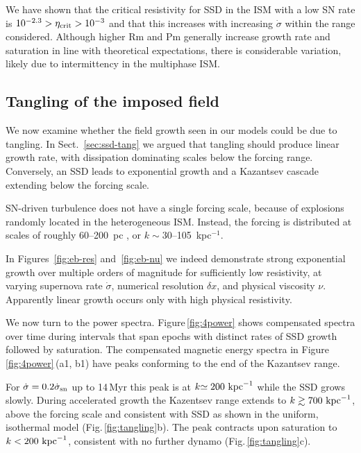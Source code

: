 \documentclass[preprint2]{aastex63}
\newcommand\SNr{\dot\sigma_{\rm sn}}
\newcommand\kpc{~ {\rm kpc}}
\newcommand\dx{ {\delta x}}
\begin{document}
{ {We have shown that the critical resistivity for SSD in the ISM with a
 low SN rate is $10^{-2.3}>\eta_{\rm crit}>10^{-3}$ and
 that this increases with increasing
 $\dot\sigma$ within the range considered.
 Although higher Rm and Pm generally increase growth rate
 and saturation
 in line with theoretical expectations,
 there is considerable variation, likely due to intermittency in
   the multiphase ISM.}
 
 
\subsection{{Tangling of the imposed field}} \label{sec:Balsara}

{We now examine whether the field growth seen in our models could
  be due to tangling.
  In Sect.~\ref{sec:ssd-tang} we argued that tangling should produce linear
  growth rate, with dissipation dominating scales below the forcing range.
  Conversely, an SSD leads to exponential growth and a Kazantsev cascade
  extending below the forcing scale.}

 SN-driven turbulence does not have a {single} forcing scale, 
 because of {explosions randomly located in} the heterogeneous ISM.
 {Instead, the} forcing {is} distributed at scales {of roughly 
 60--200~pc
   \citep{joung2006,avillez2007,HSSFG17}, or $k \sim 30$--105~kpc$^{-1}$}.

 {In {Figures~\ref{fig:eb-res} and~\ref{fig:eb-nu}} we indeed
 demonstrate strong exponential growth over multiple orders of magnitude
 {for sufficiently low resistivity, at varying supernova} rate $\dot\sigma$,
 numerical resolution $\dx$, and physical viscosity $\nu$. 
 {Apparently l}inear growth {occurs only} with high physical resistivity.}

 {We now turn to the power spectra. Figure\,\ref{fig:4power} shows
 compensated spectra over time during {intervals} that}
 {span epochs with distinct rates of SSD  growth followed by saturation.}
 The compensated magnetic energy spectra in Figure\,\ref{fig:4power}\,(a1, b1)
 have {peaks conforming to the end of the Kazantsev range.}

 {For ${\dot\sigma=0.2\SNr}$ up to 14\,Myr this peak is at
 $k{\simeq200}\kpc^{-1}$ while the
 SSD grows {slowly}.
 During accelerated growth the Kazentsev range extends to}
 $k\gtrsim{700}\kpc^{-1}$, above the forcing scale and consistent
 with SSD {as shown in the uniform, isothermal model}
 (Fig.\,\ref{fig:tangling}b).
 The peak contracts upon saturation to $k<{200}\kpc^{-1}$, consistent with no
 {further} dynamo (Fig.\,\ref{fig:tangling}c).

}
\end{document}
